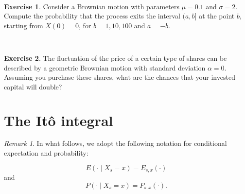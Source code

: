 \documentclass[
  11pt,
  a4paper,
]{book}
\theoremstyle{definition}
\theoremstyle{definition}
\theoremstyle{definition}
\newtheorem{exercise}{Exercise}[chapter]
\theoremstyle{definition}
\theoremstyle{remark}
\newtheorem*{remark}{Remark}
\begin{document}
\(\,\)

\begin{exercise}
\leavevmode

Consider a Brownian motion with parameters \(\mu=0.1\) and \(\sigma=2\). Compute the probability that the process exits the interval \((a,b]\) at the point \(b\), starting from \(X(0)=0\), for \(b=1,10,100\) and \(a=-b\).

\end{exercise}

\(\,\)

\begin{exercise}
\leavevmode

The fluctuation of the price of a certain type of shares can be described by a geometric Brownian motion with standard deviation \(\alpha = 0\). Assuming you purchase these shares, what are the chances that your invested capital will double?

\end{exercise}

\section{The Itô integral}\label{itoint}

\begin{remark}
In what follows, we adopt the following notation for conditional expectation and probability:

\[E(\cdot \mid X_s=x)=E_{s,x}(\cdot)\]
and
\[P(\cdot \mid X_s=x)=P_{s,x}(\cdot).\]
\end{remark}

\(\,\)
\end{document}
